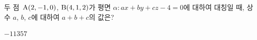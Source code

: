두 점~$\mathrm{A}(2{,}\mkern3mu\mathopen{}-1{,}\mkern3mu\mathopen{}0)$, $\mathrm{B}(4{,}\mkern3mu\mathopen{}1{,}\mkern3mu\mathopen{}2)$가 평면 $\alpha\colon ax+by+cz-4=0$에 대하여 대칭일 때, 상수 $a$, $b$, $c$에 대하여 $a+b+c$의 값은?
\begin{choices32}{$-1$}{$1$}{$3$}{$5$}{$7$}\end{choices32}
